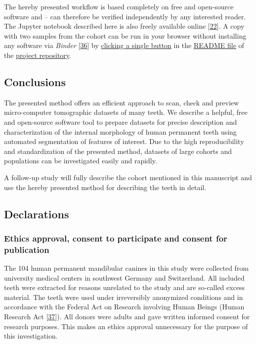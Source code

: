 \documentclass[
  american,
]{article}
\begin{document}
The hereby presented workflow is based completely on free and open-source software and -- can therefore be verified independently by any interested reader.
The Jupyter notebook described here is also freely available online {[}\protect\hyperlink{ref-tZRGGuMm}{22}{]}.
A copy with two samples from the cohort can be run in your browser without installing any software via \emph{Binder} {[}\protect\hyperlink{ref-Q20Bxdsr}{36}{]} by \href{https://mybinder.org/v2/gh/habi/zmk-tooth-cohort/master?filepath=ToothAnalysis.ipynb}{clicking a single button} in the \href{https://github.com/habi/zmk-tooth-cohort/blob/master/README.md}{README file} of the \href{https://github.com/habi/zmk-tooth-cohort/}{project repository}.

\hypertarget{conclusions}{%
\subsection{Conclusions}\label{conclusions}}

The presented method offers an efficient approach to scan, check and preview micro-computer tomographic datasets of many teeth.
We describe a helpful, free and open-source software tool to prepare datasets for precise description and characterization of the internal morphology of human permanent teeth using automated segmentation of features of interest.
Due to the high reproducibility and standardization of the presented method, datasets of large cohorts and populations can be investigated easily and rapidly.

A follow-up study will fully describe the cohort mentioned in this manuscript and use the hereby presented method for describing the teeth in detail.

\hypertarget{declarations}{%
\subsection{Declarations}\label{declarations}}

\hypertarget{ethics-approval-consent-to-participate-and-consent-for-publication}{%
\subsubsection{Ethics approval, consent to participate and consent for publication}\label{ethics-approval-consent-to-participate-and-consent-for-publication}}

The 104 human permanent mandibular canines in this study were collected from university medical centers in southwest Germany and Switzerland.
All included teeth were extracted for reasons unrelated to the study and are so-called excess material.
The teeth were used under irreversibly anonymized conditions and in accordance with the Federal Act on Research involving Human Beings (Human Research Act {[}\protect\hyperlink{ref-10OKzEtEb}{37}{]}).
All donors were adults and gave written informed consent for research purposes.
This makes an ethics approval unnecessary for the purpose of this investigation.
\end{document}
